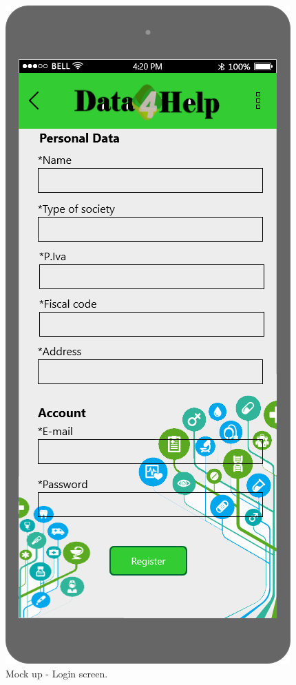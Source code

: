 \begin{figure}[h!]
\begin{minipage}[b]{0.25\textwidth}
    		\caption{Mock up - Login screen.\\}
  	\end{minipage}
	\hfill
 	\begin{minipage}[b]{0.25\textwidth}
    		\includegraphics[width=\textwidth]{./pictures/3p_registration.png}

\end{minipage}
\end{figure}
